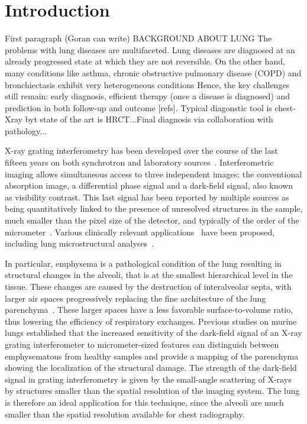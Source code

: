 \section{Introduction}\label{sec:introduction}
First paragraph (Goran can write) BACKGROUND ABOUT LUNG
The problems with lung diseases are multifaceted. Lung diseases are diagnosed at an already progressed state at which they are not reversible. On the other hand, many conditions like asthma, chronic obstructive pulmonary disease (COPD) and bronchiectasis exhibit very heterogeneous conditions Hence, the key challenges still remain: early diagnosis, efficient therapy (once a disease is diagnosed) and prediction in both follow-up and outcome [refs]. Typical diagonstic tool is chest-Xray byt state of the art is HRCT...Final diagnosis via collaboration with pathology...

X-ray grating interferometry has been developed over the course of the last
  fifteen years on both synchrotron and laboratory
sources~\cite{David_2002,1347-4065-42-7B-L866,Weitkamp_2005,1347-4065-45-6R-5254,Pfeiffer2006}. Interferometric
imaging allows simultaneous access to three independent images: the
conventional absorption image, a differential phase signal and a dark-field
signal, also known as visibility contrast. This last signal has been
reported by multiple sources as being quantitatively linked to the presence
of unresolved structures in the sample, much smaller than the pixel size of
the detector, and typically of the order of the
micrometer~\cite{Pfeiffer2008,Lynch:11,Yashiro:10}.
Various clinically relevant
applications~\cite{Wen_2009,Thilo2013} have been
proposed, including lung microstructural analyses~\cite{Schleede17880,Meinel_2014,Meinel_2013,Yaroshenko_2013}.

In particular, emphysema is a pathological condition of the lung
resulting in structural changes in the alveoli, that is at the smallest
hierarchical level in the tissue. These changes are caused by the
destruction of interalveolar septa, with larger air spaces progressively
replacing the fine architecture of the lung parenchyma~\cite{Sharafkhaneh_2008}. These larger spaces
have a less favorable surface-to-volume ratio, thus lowering the efficiency
of respiratory exchanges. Previous studies on murine lungs established that the increased sensitivity of
the dark-field signal of an X-ray grating interferometer to micrometer-sized
features can distinguish between emphysematous from healthy samples and
provide a mapping of the parenchyma showing the localization of the
structural damage. The strength of the dark-field signal in grating interferometry is
given by the small-angle scattering of X-rays by structures smaller than the
spatial resolution of the imaging system. The lung is therefore an ideal
application for this technique, since the alveoli are much
smaller than the spatial resolution available for chest radiography. 

